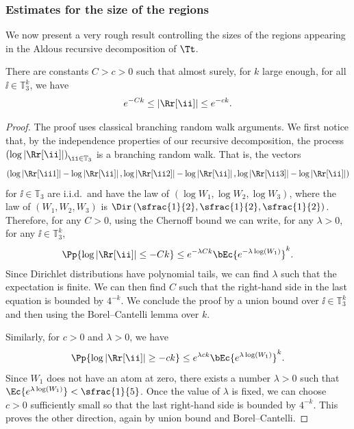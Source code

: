 \subsubsection*{Estimates for the size of the regions}
We now present a very rough result controlling the sizes of the regions appearing in the Aldous recursive decomposition of $\Tt$.
\begin{lemma}\label{lem:rough_control_size_regions}
There are constants $C>c>0$ such that almost surely, for $k$ large enough, for all $\ii \in \mathbb{T}_3^k$, we have
\[ e^{-Ck} \leq \left| \Rr[\ii ] \right| \leq e^{-ck}. \]
\end{lemma}

\begin{proof}
The proof uses classical branching random walk arguments.
We first notice that, by the independence properties of our recursive decomposition, the process $\left( \log \left| \Rr[\ii ] \right| \right)_{\ii \in \mathbb{T}_3}$ is a branching random walk.
That is, the vectors
\[ \left( \log \left| \Rr[\ii 1] \right|-\log \left| \Rr[\ii ] \right|, \log \left| \Rr[\ii 2] \right|-\log \left| \Rr[\ii ] \right|, \log \left| \Rr[\ii 3] \right|-\log \left| \Rr[\ii ] \right| \right) \]
for $\ii \in \mathbb{T}_3$ are i.i.d.\ and have the law of $\left( \log W_1, \log W_2, \log W_3 \right)$, where the law of $(W_1,W_2,W_3)$ is $\Dir \left( \sfrac{1}{2}, \sfrac{1}{2}, \sfrac{1}{2} \right)$.
Therefore, for any $C>0$, using the Chernoff bound we can write, for any $\lambda>0$, for any $\ii\in \mathbb{T}_3^k$,
\begin{align}\label{eq:chernoff inequality upper bound size regions}
\Pp{\log \left| \Rr[\ii ] \right| \leq -Ck} \leq e^{-\lambda C k} \bEc{e^{-\lambda \log(W_1)}}^k.
\end{align}
Since Dirichlet distributions have polynomial tails, we can find $\lambda$ such that the expectation is finite.
We can then find $C$ such that the right-hand side in the last equation is bounded by $4^{-k}$.
We conclude the proof by a union bound over $\ii \in \mathbb{T}_3^k$ and then using the Borel--Cantelli lemma over $k$.

Similarly, for $c>0$ and $\lambda>0$, we have
\[ \Pp{\log \left| \Rr[\ii ] \right| \geq -ck} \leq e^{\lambda c k} \bEc{e^{\lambda \log(W_1)}}^k. \]
Since $W_1$ does not have an atom at zero, there exists a number $\lambda>0$ such that $\Ec{e^{\lambda \log(W_1)}}<\sfrac{1}{5}$.
Once the value of $\lambda$ is fixed, we can choose $c>0$ sufficiently small so that the last right-hand side is bounded by $4^{-k}$.
This proves the other direction, again by union bound and Borel--Cantelli.
\end{proof}

